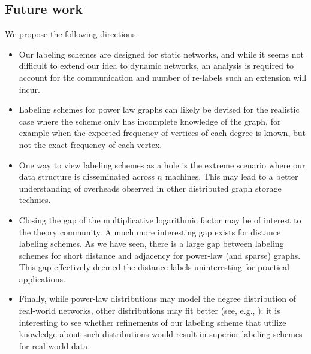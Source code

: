 \subsection{Future work}
We propose the following directions:
\begin{itemize}
\item{Our labeling schemes are designed for static networks, and while it seems not difficult to extend our idea to dynamic networks, an analysis is required to account for the communication and number of re-labels such an extension will incur.}
\item{Labeling schemes for power law graphs can likely be devised for the realistic case where the scheme only has incomplete knowledge of the graph, for example when the expected frequency of vertices of each degree is known, but not the exact frequency of each vertex.}
\item{One way to view labeling schemes as a hole is the extreme scenario where our data structure is disseminated across $n$ machines.
This may lead to a better understanding of  overheads observed in other  distributed graph storage technics.}
\item{Closing the  gap of the multiplicative logarithmic factor may be  of interest to the theory community. A much more interesting gap exists for distance labeling schemes.
As we have seen, there is a large gap between labeling schemes for short distance and adjacency for power-law (and sparse) graphs.
This gap effectively deemed the distance labels uninteresting for practical applications.}
\item{Finally, while power-law distributions may model the degree distribution of real-world networks, other distributions
may fit better (see, e.g., \cite{clauset2009power}); it is interesting to see whether refinements of our labeling scheme that utilize knowledge about such distributions would result in superior labeling schemes for real-world data.}
\end{itemize}

